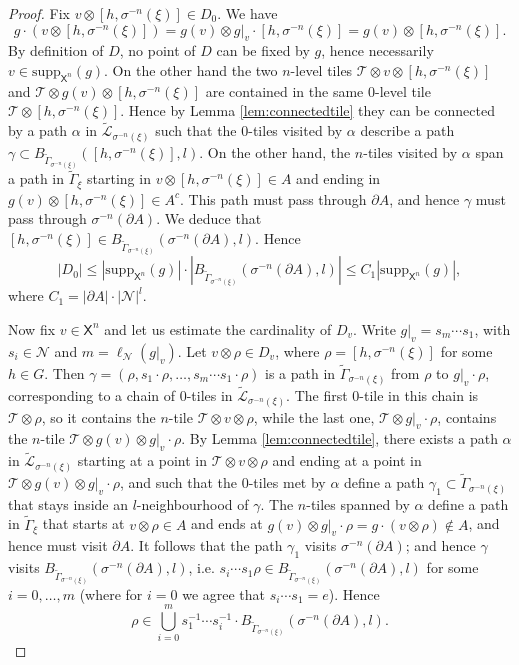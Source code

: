 \documentclass[11pt]{amsart}
\newcommand{\til}{\mathcal{T}}
\newcommand{\leaf}{\mathcal{L}}
\newcommand{\leaftilde}{\widetilde{\leaf}}
\newcommand{\alb}{\ensuremath{\mathsf{X}}}%
\newcommand{\nuke}{\ensuremath{\mathcal{N}}}%
\newcommand{\Gammatilde}{\ensuremath{\widetilde{\Gamma}}}%
\theoremstyle{definition}
\theoremstyle{plain}
\newtheorem{main thm}{Theorem}
\theoremstyle{remark}
\theoremstyle{plain}
\begin{document}
\begin{proof}
Fix $v\otimes [h, \sigma^{-n}(\xi)]\in D_0$. We have 
\[g\cdot (v\otimes [h, \sigma^{-n}(\xi)])=g(v)\otimes g|_v\cdot [h, \sigma^{-n}(\xi)]=g(v)\otimes  [h, \sigma^{-n}(\xi)].\] By definition of $D$, no point of $D$ can be fixed by $g$, hence necessarily $v\in \mathrm{supp}_{\alb^n}(g)$. On the other hand the two $n$-level tiles $ \til\otimes v\otimes [h, \sigma^{-n}(\xi)]$ and $\til\otimes g(v)\otimes  [h, \sigma^{-n}(\xi)]$ are contained in the same 0-level tile $\til\otimes [h, \sigma^{-n}(\xi)]$. Hence by Lemma \ref{lem:connectedtile} they can be connected by a path $\alpha$ in $\leaftilde_{\sigma^{-n}(\xi)}$ such that the  $0$-tiles visited by $\alpha$  describe a path $\gamma\subset B_{\Gammatilde_{\sigma^{-n}(\xi)}}([h, \sigma^{-n}(\xi)], l)$. On the other hand, the $n$-tiles visited by $\alpha$ span a path in $\Gammatilde_\xi$ starting in $v\otimes [h, \sigma^{-n}(\xi)]\in A$ and ending in $g(v)\otimes [h, \sigma^{-n}(\xi)]\in A^c$. This path must pass through $\partial A$, and hence $\gamma$ must pass through $\sigma^{-n}(\partial A)$. We deduce that $ [h, \sigma^{-n}(\xi)]\in B_{\Gammatilde_{\sigma^{-n}(\xi)}}(\sigma^{-n}(\partial A), l)$. Hence
\begin{equation}|D_0|\leq |\mathrm{supp}_{\alb^n}(g)|\cdot |B_{\Gammatilde_{\sigma^{-n}(\xi)}}(\sigma^{-n}(\partial A), l) |\leq C_1 |\mathrm{supp}_{\alb^n}(g)|,\label{e-D0}\end{equation}
where $C_1=|\partial A|\cdot |\nuke |^l$.

Now fix $v\in \alb^n$ and let us estimate the cardinality of $D_v$. Write $g|_v=s_m\cdots s_1$, with $s_i\in \nuke$ and $m=\ell_\nuke(g|_v)$. Let $v\otimes\rho\in D_v$, where $\rho=[h, \sigma^{-n}(\xi)]$ for some $h\in G$. Then $\gamma=(\rho, s_1\cdot \rho,\ldots, s_m\cdots s_1\cdot \rho)$ is a path in $\Gammatilde_{\sigma^{-n}(\xi)}$ from $\rho$ to $g|_v\cdot \rho$, corresponding to a chain of 0-tiles in $\leaftilde_{\sigma^{-n}(\xi)}$. The first 0-tile in this chain is  $\til\otimes \rho$, so it  contains the $n$-tile $\til \otimes v\otimes \rho$, while the last one,  $\til\otimes g|_v\cdot \rho$, contains the $n$-tile $\til\otimes g(v)\otimes g|_v\cdot \rho$.  By Lemma \ref{lem:connectedtile}, there exists a path $\alpha$ in $\leaftilde_{\sigma^{-n}(\xi)}$ starting at a point in $\til \otimes v\otimes \rho$ and ending at a point in $\til\otimes g(v)\otimes g|_v\cdot \rho$, and such that the 0-tiles met by $\alpha$ define a path $\gamma_1\subset \Gammatilde_{\sigma^{-n}(\xi)}$ that stays inside an $l$-neighbourhood of $\gamma$. The $n$-tiles spanned by $\alpha$ define a path in $\Gammatilde_\xi$ that starts at  $v\otimes \rho\in A$ and ends at $g(v)\otimes g|_v\cdot \rho=g\cdot( v\otimes \rho)\notin A$, and hence must visit $\partial A$. It follows that the path $\gamma_1$ visits $\sigma^{-n}(\partial A)$; and hence $\gamma$ visits $B_{\Gammatilde_{\sigma^{-n}(\xi)}}(\sigma^{-n}(\partial A), l)$, i.e. $s_i\cdots s_1\rho \in B_{\Gammatilde_{\sigma^{-n}(\xi)}}(\sigma^{-n}(\partial A), l)$ for some $i=0, \ldots, m$ (where for $i=0$ we agree that $s_i\cdots s_1=e$). Hence 
\[\rho\in\bigcup_{i=0}^m s_1^{-1}\cdots s^{-1}_i\cdot B_{\Gammatilde_{\sigma^{-n}(\xi)}}(\sigma^{-n}(\partial A), l).\] 


\end{proof}
\end{document}
